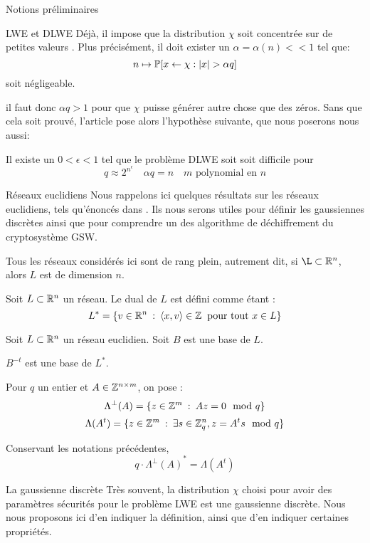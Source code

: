 \begin{section}{Notions préliminaires}
\begin{subsection}{LWE et DLWE}
	Déjà, il impose que la distribution $\chi$ soit \og concentrée sur de
	petites valeurs \fg. Plus précisément, il doit exister un
	$\alpha = \alpha(n) << 1$ tel que:
	\[ n \mapsto \mathbb{P} [x \leftarrow \chi : |x| > \alpha q]\] 
	soit négligeable.

	il faut donc $\alpha q > 1$ pour que $\chi$ puisse générer autre chose 
	que des zéros. 
	Sans que cela soit prouvé, l'article pose alors l'hypothèse suivante,
	que nous poserons nous aussi:

	\begin{hyp}
	\label{hyp_dwle}
	Il existe un $0 < \epsilon < 1$ tel que le problème DLWE soit
	soit difficile pour 
	\[ q \approx 2^{n^\epsilon}\quad \alpha q = n\quad \text{$m$ polynomial en $n$}\]
	\end{hyp}

	\end{subsection}
	\begin{subsection}{Réseaux euclidiens}
	Nous rappelons ici quelques résultats sur les réseaux euclidiens, tels qu'énoncés dans \cite{EC:MicPei12}. Ils nous serons utiles pour définir les gaussiennes discrètes ainsi que pour comprendre un des algorithme de déchiffrement du cryptosystème GSW.

	Tous les réseaux considérés ici sont de rang plein, autrement dit, si $\L \subset \RR^n$, alors $L$ est de dimension $n$.

	\begin{definition}
	Soit $L\subset \mathbb{R}^n$ un réseau. Le dual de $L$ est défini comme étant :
	\[ L^* = \{ v \in \mathbb{R}^n \::\: \langle x, v \rangle \in \mathbb{Z}
	   \:\text{ pour tout } x\in L\} \]
	\end{definition}
	\begin{prop} 
	Soit $L \subset \mathbb{R}^n$ un réseau euclidien. Soit $B$ est une base de $L$.
	
	$B^{-t}$ est une base de $L^*$.
	\end{prop}

	Pour $q$ un entier et $A \in \mathbb{Z}^{n\times m}$, on pose :
		\[\Lambda^\bot(A) = \{ z \in \mathbb{Z}^m\: :\: A z  = 0 \mod q \}\] 
	\[\Lambda(A^t) = \{ z \in \mathbb{Z}^m\: : \: \exists s\in \mathbb{Z}_q^n, z = A^t s \mod q\}\]

		\begin{prop} \label{lambda_reseau}
	Conservant les notations précédentes, 
	\[q \cdot {\Lambda^\bot(A)}^* =  \Lambda(A^t)\] 
	\end{prop}
	\end{subsection}
	
	\begin{subsection}{La gaussienne discrète}
	Très souvent, la distribution $\chi$ choisi pour avoir des paramètres sécurités pour le problème LWE est une gaussienne discrète. Nous nous proposons ici d'en indiquer la définition, ainsi que d'en indiquer certaines propriétés.


\end{subsection}
\end{section}
